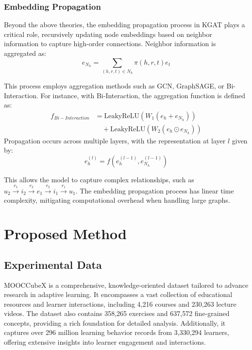 \documentclass{ieeeaccess}
\begin{document}
\subsubsection{Embedding Propagation}

Beyond the above theories, the embedding propagation process in KGAT plays a critical role, recursively updating node embeddings based on neighbor information to capture high-order connections. Neighbor information is aggregated as:
\begin{equation}
     e_{N_h} = \sum_{(h, r, t) \in N_h} \pi(h, r, t) e_t
\end{equation}

This process employs aggregation methods such as GCN, GraphSAGE, or Bi-Interaction. For instance, with Bi-Interaction, the aggregation function is defined as:
\begin{equation}
    \begin{split} %
        f_{Bi-Interaction} &= \text{LeakyReLU}(W_1(e_h + e_{N_h})) \\ %
        &\quad + \text{LeakyReLU}(W_2(e_h \odot e_{N_h}))
    \end{split} %
\end{equation}
Propagation occurs across multiple layers, with the representation at layer \( l \) given by:
\begin{equation}
    e^{(l)}_h = f(e^{(l-1)}_h, e^{(l-1)}_{N_h})
\end{equation}

This allows the model to capture complex relationships, such as \(
u_2 \xrightarrow{r_1} i_2 \xrightarrow{r_2} e_1 \xrightarrow{r_2} i_1 \xrightarrow{r_1} u_1
\). The embedding propagation process has linear time complexity, mitigating computational overhead when handling large graphs.



\section{Proposed Method}
\label{sec:proposed_method}
\subsection{Experimental Data}

MOOCCubeX \cite{yu2021mooccubex} is a comprehensive, knowledge-oriented dataset tailored to advance research in adaptive learning. It encompasses a vast collection of educational resources and learner interactions, including 4,216 courses and 230,263 lecture videos. The dataset also contains 358,265 exercises and 637,572 fine-grained concepts, providing a rich foundation for detailed analysis. Additionally, it captures over 296 million learning behavior records from 3,330,294 learners, offering extensive insights into learner engagement and interactions.
\end{document}
